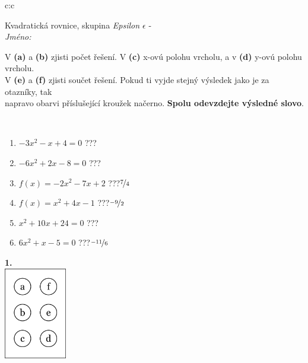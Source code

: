 \documentclass[10pt]{report}
\begin{document}
\begin{tabular}{c:c}
\begin{minipage}[c][104.5mm][t]{0.5\linewidth}
\begin{center}
\vspace{7mm}
{\huge Kvadratická rovnice, skupina \textit{Epsilon $\epsilon$} -}\\[5mm]
\textit{Jméno:}\phantom{xxxxxxxxxxxxxxxxxxxxxxxxxxxxxxxxxxxxxxxxxxxxxxxxxxxxxxxxxxxxxxxxx}\\[5mm]
\begin{minipage}{0.95\linewidth}
\begin{center}
V \textbf{(a)} a \textbf{(b)} zjisti počet řešení. V \textbf{(c)} x-ovú polohu vrcholu, a v \textbf{(d)} y-ovú polohu vrcholu.\\V \textbf{(e)} a \textbf{(f)} zjisti součet řešení. Pokud ti vyjde stejný výsledek jako je za otazníky, tak\\napravo obarvi příslušející kroužek načerno. \textbf{Spolu odevzdejte výsledné slovo}.
\end{center}
\end{minipage}
\\[1mm]
\begin{minipage}{0.79\linewidth}
\begin{center}
\begin{varwidth}{\linewidth}
\begin{enumerate}
\Large
\item $-3x^2-x+4=0$\quad \dotfill\; ???\;\dotfill {}
\item $-6x^2+2x-8=0$\quad \dotfill\; ???\;\dotfill {}
\item $f(x)=-2x^2-7x+2$\quad \dotfill\; ???\;\dotfill \quad $\nicefrac{7}{4}$
\item $f(x)=x^2+4x-1$\quad \dotfill\; ???\;\dotfill \quad $\nicefrac{-9}{2}$
\item $x^2+10x+24=0$\quad \dotfill\; ???\;\dotfill {}
\item $6x^2+x-5=0$\quad \dotfill\; ???\;\dotfill \quad $\nicefrac{-11}{6}$
\end{enumerate}
\end{varwidth}
\end{center}
\end{minipage}
\begin{minipage}{0.20\linewidth}
\begin{center}
{\Huge\bfseries 1.} \\[2mm]
\includegraphics[height=40mm]{../images/braille.png}

\end{center}
\end{minipage}
\end{center}
\end{minipage}
\end{tabular}
\end{document}
